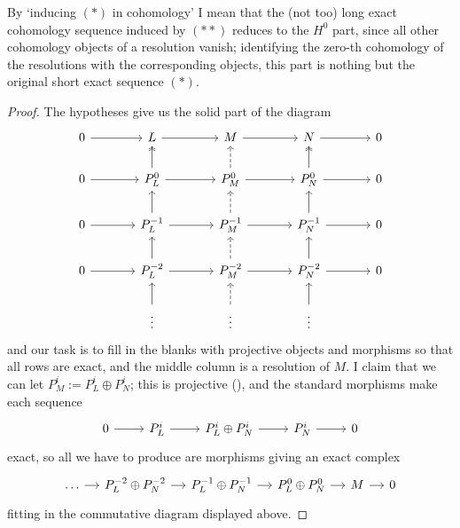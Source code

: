 By `inducing $(*)$ in cohomology' I mean that the (not too) long exact
cohomology sequence induced by $(**)$ reduces to the $H^0$ part, since
all other cohomology objects of a resolution vanish; identifying the
zero-th cohomology of the resolutions with the corresponding objects,
this part is nothing but the original short exact sequence $(*)$.
\begin{proof}
  The hypotheses give us the solid part of the diagram
  \[\begin{tikzcd}[column sep=large]
      0 \arrow[r] & L \arrow[r] & M \arrow[r] & N \arrow[r] & 0 \\
      0 \arrow[r] & P_L^0 \arrow[u, twoheadrightarrow] \arrow[r] &
      P_M^0 \arrow[u, dashed] \arrow[r] & P_N^0 \arrow[u,
      twoheadrightarrow]
      \arrow[r] & 0 \\
      0 \arrow[r] & P_L^{-1} \arrow[u] \arrow[r] & P_M^{-1} \arrow[u,
      dashed]
      \arrow[r] & P_N^{-1} \arrow[u] \arrow[r] & 0 \\
      0 \arrow[r] & P_L^{-2} \arrow[u] \arrow[r] & P_M^{-2} \arrow[u,
      dashed]
      \arrow[r] & P_N^{-2} \arrow[u] \arrow[r] & 0 \\
      & \vdots \arrow[u] & \vdots \arrow[u, dashed] & \vdots \arrow[u]
      &
    \end{tikzcd}\] and our task is to fill in the blanks with
  projective objects and morphisms so that all rows are exact, and the
  middle column is a resolution of $M$. I claim that we can let
  $P_M^i := P_L^i \oplus P_N^i$; this is projective
  (),
  and the standard morphisms make each sequence
  \[\begin{tikzcd}
      0 \arrow[r] & P_L^i \arrow[r] & P_L^i \oplus P_N^i \arrow[r] &
      P_N^i \arrow[r] & 0
    \end{tikzcd}\] exact, so all we have to produce are morphisms
  giving an exact complex
  \[\begin{tikzcd}[column sep=small]
      \dots \arrow[r] & P_L^{-2} \oplus P_N^{-2} \arrow[r] & P_L^{-1}
      \oplus P_N^{-1} \arrow[r] & P_L^0 \oplus P_N^0 \arrow[r] & M
      \arrow[r] & 0
    \end{tikzcd}\] fitting in the commutative diagram displayed above.


\end{proof}
